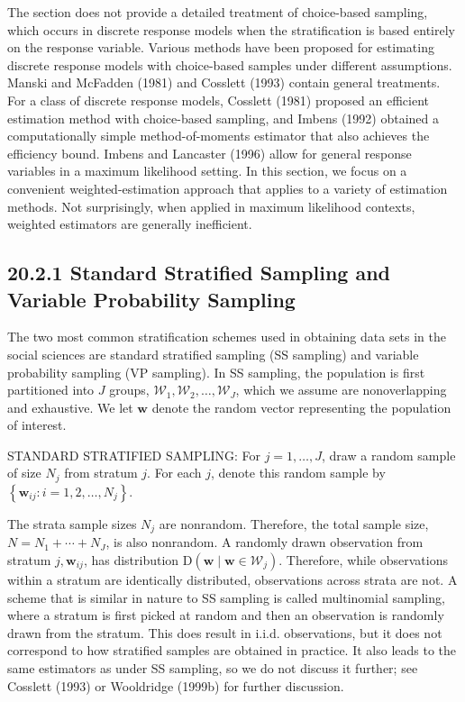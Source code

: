\documentclass[10pt]{article}
\begin{document}
The section does not provide a detailed treatment of choice-based sampling, which occurs in discrete response models when the stratification is based entirely on the response variable. Various methods have been proposed for estimating discrete response models with choice-based samples under different assumptions. Manski and McFadden (1981) and Cosslett (1993) contain general treatments. For a class of discrete response models, Cosslett (1981) proposed an efficient estimation method with choice-based sampling, and Imbens (1992) obtained a computationally simple method-of-moments estimator that also achieves the efficiency bound. Imbens and Lancaster (1996) allow for general response variables in a maximum likelihood setting. In this section, we focus on a convenient weighted-estimation approach that applies to a variety of estimation methods. Not surprisingly, when applied in maximum likelihood contexts, weighted estimators are generally inefficient.

\subsection*{20.2.1 Standard Stratified Sampling and Variable Probability Sampling}
The two most common stratification schemes used in obtaining data sets in the social sciences are standard stratified sampling (SS sampling) and variable probability sampling (VP sampling). In SS sampling, the population is first partitioned into $J$ groups, $\mathscr{W}_{1}, \mathscr{W}_{2}, \ldots, \mathscr{W}_{J}$, which we assume are nonoverlapping and exhaustive. We let $\mathbf{w}$ denote the random vector representing the population of interest.

STANDARD STRATIFIED SAMPLING: For $j=1, \ldots, J$, draw a random sample of size $N_{j}$ from stratum $j$. For each $j$, denote this random sample by $\left\{\mathbf{w}_{i j}: i=1,2, \ldots, N_{j}\right\}$.

The strata sample sizes $N_{j}$ are nonrandom. Therefore, the total sample size, $N= N_{1}+\cdots+N_{J}$, is also nonrandom. A randomly drawn observation from stratum $j, \mathbf{w}_{i j}$, has distribution $\mathrm{D}\left(\mathbf{w} \mid \mathbf{w} \in \mathscr{W}_{j}\right)$. Therefore, while observations within a stratum are identically distributed, observations across strata are not. A scheme that is similar in nature to SS sampling is called multinomial sampling, where a stratum is first picked at random and then an observation is randomly drawn from the stratum. This does result in i.i.d. observations, but it does not correspond to how stratified samples are obtained in practice. It also leads to the same estimators as under SS sampling, so we do not discuss it further; see Cosslett (1993) or Wooldridge (1999b) for further discussion.
\end{document}
